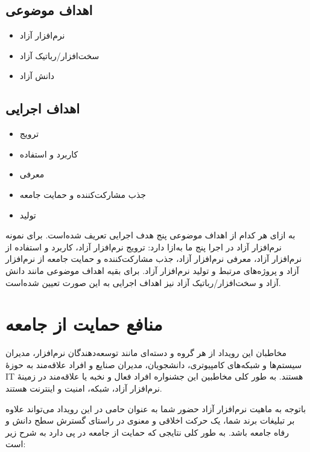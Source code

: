 \documentclass{article}
\begin{document}
{\subsection{اهداف موضوعی}
\begin{flushright}

\begin{itemize}
\item نرم‌افزار آزاد
\item سخت‌افزار/رباتیک آزاد
\item دانش آزاد
\end{itemize}
\end{flushright}

\subsection{اهداف اجرایی}

\begin{flushright}
\begin{itemize}
\item ترویج
\item کاربرد و استفاده
\item معرفی
\item جذب مشارکت‌کننده و حمایت جامعه
\item تولید
\end{itemize}
\end{flushright}

به ازای هر کدام از اهداف موضوعی پنج هدف اجرایی تعریف شده‌است. برای نمونه نرم‌افزار آزاد در اجرا پنج ما به‌ازا دارد: ترویج نرم‌افزار آزاد، کاربرد و استفاده از نرم‌افزار آزاد، معرفی نرم‌افزار آزاد، جذب مشارکت‌کننده و حمایت جامعه از نرم‌افزار آزاد و پروژه‌های مرتبط و تولید نرم‌افزار آزاد. برای بقیه اهداف موضوعی مانند دانش آزاد و سخت‌افزار/رباتیک آزاد نیز اهداف اجرایی به این صورت تعیین شده‌است.

\section{منافع حمایت از جامعه}
مخاطبان این رویداد از هر گروه و دسته‌ای مانند توسعه‌دهندگان نرم‌افزار، مدیران سیستم‌ها و شبکه‌های کامپیوتری، دانشجویان، مدیران صنایع و افراد علاقه‌مند به حوزهٔ IT  هستند. به طور کلی مخاطبین این جشنواره افراد فعال و نخبه یا علاقه‌مند در زمینهٔ نرم‌افزار آزاد، شبکه، امنیت و اینترنت هستند.

\begin{flushright}

باتوجه به ماهیت نرم‌افزار آزاد حضور شما به عنوان حامی در این رویداد می‌تواند علاوه‌ بر تبلیغات برند شما، یک حرکت اخلاقی و معنوی در راستای گسترش سطح دانش و رفاه جامعه باشد. به طور کلی نتایجی که حمایت از جامعه در پی دارد به شرح زیر است:


\end{flushright}}
\end{document}
